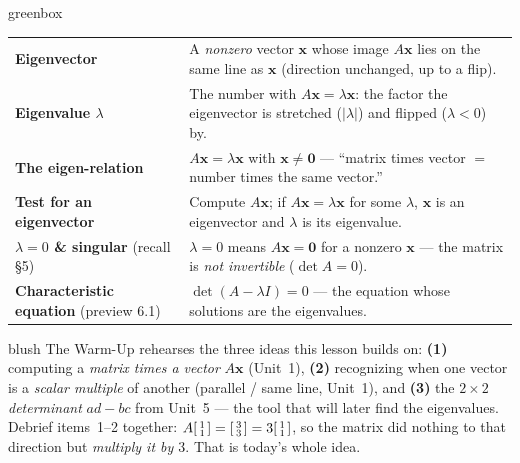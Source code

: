 \documentclass[10pt]{article}
\newcommand{\xx}{\mathbf{x}}
\newcommand{\zero}{\mathbf{0}}
\begin{document}
\begin{skillbox}{greenbox}
\renewcommand{\arraystretch}{1.3}
\begin{tabularx}{\linewidth}{@{}l X@{}}
\textbf{Eigenvector} & A \emph{nonzero} vector $\xx$ whose image $A\xx$ lies on the same line as $\xx$ (direction unchanged, up to a flip). \\
\textbf{Eigenvalue $\lambda$} & The number with $A\xx=\lambda\xx$: the factor the eigenvector is stretched ($|\lambda|$) and flipped ($\lambda<0$) by. \\
\textbf{The eigen-relation} & $A\xx=\lambda\xx$ with $\xx\ne\zero$ --- ``matrix times vector $=$ number times the same vector.'' \\
\textbf{Test for an eigenvector} & Compute $A\xx$; if $A\xx=\lambda\xx$ for some $\lambda$, $\xx$ is an eigenvector and $\lambda$ is its eigenvalue. \\
\textbf{$\lambda=0$ \& singular} (recall §5) & $\lambda=0$ means $A\xx=\zero$ for a nonzero $\xx$ --- the matrix is \emph{not invertible} ($\det A=0$). \\
\textbf{Characteristic equation} (preview 6.1) & $\det(A-\lambda I)=0$ --- the equation whose solutions are the eigenvalues. \\
\end{tabularx}
\end{skillbox}

\begin{fixedskillbox}{blush}
    The Warm-Up rehearses the three ideas this lesson builds on:
    \textbf{(1)} computing a \emph{matrix times a vector} $A\xx$ (Unit~1),
    \textbf{(2)} recognizing when one vector is a \emph{scalar multiple} of another (parallel /
    same line, Unit~1), and
    \textbf{(3)} the $2\times2$ \emph{determinant} $ad-bc$ from Unit~5 --- the tool that will later
    find the eigenvalues. Debrief items~1--2 together: $A\begin{bsmallmatrix}1\\1\end{bsmallmatrix}
    =\begin{bsmallmatrix}3\\3\end{bsmallmatrix}=3\begin{bsmallmatrix}1\\1\end{bsmallmatrix}$, so the
    matrix did nothing to that direction but \emph{multiply it by $3$}. That is today's whole idea.
\end{fixedskillbox}
\end{document}
